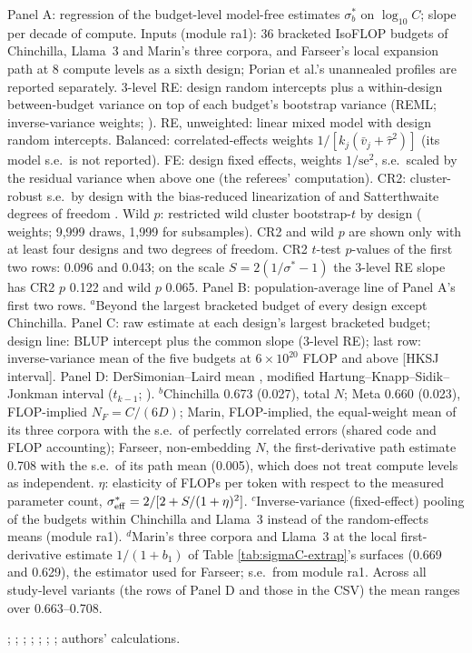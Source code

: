 \begin{table}[tp]
\begin{tablenotes}
Panel A: regression of the budget-level model-free estimates $\sigma^*_b$ on $\log_{10}C$; slope per decade of compute. Inputs (module ra1): 36 bracketed IsoFLOP budgets of Chinchilla, Llama~3 and Marin's three corpora, and Farseer's local expansion path at 8 compute levels as a sixth design; Porian et al.'s unannealed profiles are reported separately. 3-level RE: design random intercepts plus a within-design between-budget variance on top of each budget's bootstrap variance (REML; inverse-variance weights; \citealt{konstantopoulos2011fixed}). RE, unweighted: linear mixed model with design random intercepts. Balanced: correlated-effects weights $1/[k_j(\bar v_j+\hat\tau^2)]$ \citep{hedges2010robust} (its model s.e.\ is not reported). FE: design fixed effects, weights $1/\mathrm{se}^2$, s.e.\ scaled by the residual variance when above one (the referees' computation). CR2: cluster-robust s.e.\ by design with the bias-reduced linearization of \citet{bell2002bias} and Satterthwaite degrees of freedom \citep{pustejovsky2018small,tipton2015small}. Wild $p$: restricted wild cluster bootstrap-$t$ by design (\citealt{webb2023reworking} weights; 9,999 draws, 1,999 for subsamples). CR2 and wild $p$ are shown only with at least four designs and two degrees of freedom. CR2 $t$-test $p$-values of the first two rows: 0.096 and 0.043; on the scale $S=2(1/\sigma^*-1)$ the 3-level RE slope has CR2 $p$ 0.122 and wild $p$ 0.065. Panel B: population-average line of Panel A's first two rows. $^{a}$Beyond the largest bracketed budget of every design except Chinchilla. Panel C: raw estimate at each design's largest bracketed budget; design line: BLUP intercept plus the common slope (3-level RE); last row: inverse-variance mean of the five budgets at $6\times10^{20}$ FLOP and above [HKSJ interval]. Panel D: DerSimonian--Laird mean \citep{dersimonian1986meta}, modified Hartung--Knapp--Sidik--Jonkman interval ($t_{k-1}$; \citealt{hartung2001tests,sidik2002simple}). $^{b}$Chinchilla 0.673 (0.027), total $N$; Meta 0.660 (0.023), FLOP-implied $N_F=C/(6D)$; Marin, FLOP-implied, the equal-weight mean of its three corpora with the s.e.\ of perfectly correlated errors (shared code and FLOP accounting); Farseer, non-embedding $N$, the first-derivative path estimate 0.708 with the s.e.\ of its path mean (0.005), which does not treat compute levels as independent. $\eta$: elasticity of FLOPs per token with respect to the measured parameter count, $\sigma^*_{\rm eff}=2/[2+S/(1+\eta)^2]$. $^{c}$Inverse-variance (fixed-effect) pooling of the budgets within Chinchilla and Llama~3 instead of the random-effects means (module ra1). $^{d}$Marin's three corpora and Llama~3 at the local first-derivative estimate $1/(1+b_1)$ of Table \ref{tab:sigmaC-extrap}'s surfaces (0.669 and 0.629), the estimator used for Farseer; s.e.\ from module ra1. Across all study-level variants (the rows of Panel D and those in the CSV) the mean ranges over 0.663--0.708.
\end{tablenotes}

\begin{tablenotes}[Source]
\citet{hoffmann2022training}; \citet{besiroglu2024chinchilla}; \citet{grattafiori2024llama}; \citet{czech2026llama3isoflop}; \citet{marin2026ladders}; \citet{porian2024resolving}; \citet{li2025predictableb}; authors' calculations.
\end{tablenotes}
\end{table}
